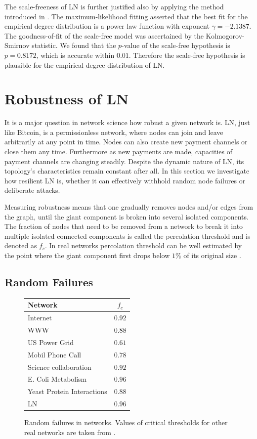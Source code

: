 \documentclass[a4paper]{article}
\theoremstyle{definition}
\begin{document}
The scale-freeness of LN is further justified also by applying the method introduced in \cite{clauset2009power}. The maximum-likelihood fitting asserted that the best fit for the empirical degree distribution is a power law function with exponent $\gamma=-2.1387$. The goodness-of-fit of the scale-free model was ascertained by the Kolmogorov-Smirnov statistic. We found that the $p$-value of the scale-free hypothesis is $p=0.8172$, which is accurate within $0.01$. Therefore the scale-free hypothesis is plausible for the empirical degree distribution of LN.

\section{Robustness of LN}
It is a major question in network science how robust a given network is. LN, just like Bitcoin, is a permissionless network, where nodes can join and leave arbitrarily at any point in time. Nodes can also create new payment channels or close them any time. Furthermore as new payments are made, capacities of payment channels are changing steadily. Despite the dynamic nature of LN, its topology's characteristics remain constant after all.
In this section we investigate how resilient LN is, whether it can effectively withhold random node failures or deliberate attacks.

Measuring robustness means that one gradually removes nodes and/or edges from the graph, until the giant component is broken into several isolated components. The fraction of nodes that need to be removed from a network to break it into multiple isolated connected components is called the percolation threshold and is denoted as $f_c$. In real networks percolation threshold can be well estimated by the point where the giant component first drops below $1\%$ of its original size \cite{barabasi2016network}.
\subsection{Random Failures}
\begin{figure}
	\begin{tabular}{ | l | c | }
		\hline
		Network & $f_c$  \\ \hline
		Internet & $0.92$  \\ \hline
		WWW & $0.88$ \\ \hline
		US Power Grid & $0.61$  \\ \hline
		Mobil Phone Call & $0.78$ \\ \hline
		Science collaboration& $0.92$ \\ \hline
		E. Coli Metabolism & $0.96$ \\ \hline
		Yeast Protein Interactions & $0.88$ \\ \hline
		LN & $0.96$ \\ \hline
	\end{tabular}
	\caption{Random failures in networks. Values of critical thresholds for other real networks are taken from \cite{barabasi2016network}.}\label{fig:randfailures}
\end{figure}
\end{document}
